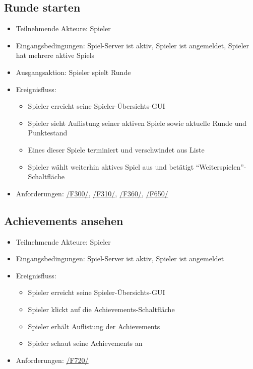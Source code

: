 \documentclass[a4paper]{scrreprt}
\begin{document}
	\subsection{Runde starten}
	\begin{itemize}
		\item Teilnehmende Akteure: \Gls{Spieler}
		\item Eingangsbedingungen: \Gls{Spiel-Server} ist aktiv, \Gls{Spieler} ist angemeldet, \Gls{Spieler} hat mehrere aktive \Glspl{Spiel}
		\item Ausgangsaktion: Spieler spielt Runde
		\item Ereignisfluss:
		\begin{itemize}
			\item \Gls{Spieler} erreicht seine Spieler-Übersichts-GUI
			\item \Gls{Spieler} sieht Auflistung seiner aktiven Spiele sowie aktuelle Runde und Punktestand %
			\item Eines dieser Spiele terminiert und verschwindet aus Liste
			\item \Gls{Spieler} wählt weiterhin aktives Spiel aus und betätigt \enquote{Weiterspielen}-Schaltfläche
		\end{itemize}
		\item Anforderungen: \hyperlink{F300}{/F300/}, \hyperlink{F310}{/F310/}, \hyperlink{F360}{/F360/}, \hyperlink{F650}{/F650/}
	\end{itemize}
	
    \subsection{Achievements ansehen}
    \begin{itemize}
        \item Teilnehmende Akteure: \Gls{Spieler}
        \item Eingangsbedingungen: \Gls{Spiel-Server} ist aktiv, \Gls{Spieler} ist angemeldet
        \item Ereignisfluss:
        \begin{itemize}
            \item \Gls{Spieler} erreicht seine Spieler-Übersichts-GUI
            \item \Gls{Spieler} klickt auf die Achievements-Schaltfläche %
            \item \Gls{Spieler} erhält Auflistung der Achievements
            \item \Gls{Spieler} schaut seine Achievements an
        \end{itemize}
        \item Anforderungen: \hyperlink{F720}{/F720/}
    \end{itemize}
\end{document}
